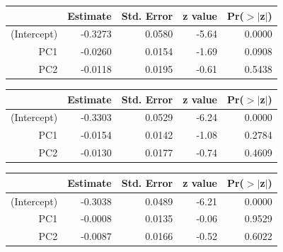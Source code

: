 \documentclass[a4paper,12pt]{Latex/Classes/PhDthesisPSnPDF}
\begin{document}
\newpage
\begin{center}
\begin{table}[ht]
\centering
\begin{tabular}{rrrrr}
  \hline
 & Estimate & Std. Error & z value & Pr($>$$|$z$|$) \\ 
  \hline
(Intercept) & -0.3273 & 0.0580 & -5.64 & 0.0000 \\ 
  PC1 & -0.0260 & 0.0154 & -1.69 & 0.0908 \\ 
  PC2 & -0.0118 & 0.0195 & -0.61 & 0.5438 \\ 
   \hline
\end{tabular}
\end{table}\end{center}
\begin{center}
\begin{table}[ht]
\centering
\begin{tabular}{rrrrr}
  \hline
 & Estimate & Std. Error & z value & Pr($>$$|$z$|$) \\ 
  \hline
(Intercept) & -0.3303 & 0.0529 & -6.24 & 0.0000 \\ 
  PC1 & -0.0154 & 0.0142 & -1.08 & 0.2784 \\ 
  PC2 & -0.0130 & 0.0177 & -0.74 & 0.4609 \\ 
   \hline
\end{tabular}
\end{table}\end{center}
\begin{center}
\begin{table}[ht]
\centering
\begin{tabular}{rrrrr}
  \hline
 & Estimate & Std. Error & z value & Pr($>$$|$z$|$) \\ 
  \hline
(Intercept) & -0.3038 & 0.0489 & -6.21 & 0.0000 \\ 
  PC1 & -0.0008 & 0.0135 & -0.06 & 0.9529 \\ 
  PC2 & -0.0087 & 0.0166 & -0.52 & 0.6022 \\ 
   \hline
\end{tabular}
\end{table}\end{center}
\end{document}
